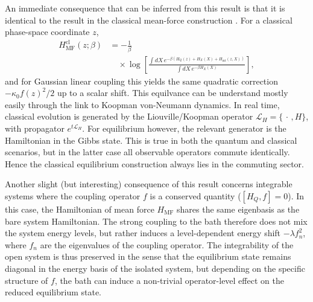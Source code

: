 An immediate consequence that can be inferred from this result is that it is identical to the result in the classical mean-force construction
\cite{campisiTalknerHanggi2009Solvable,talknerColloquiumStatisticalMechanics2020,cerisolaQuantumClassicalCorrespondence2024}.
For a classical phase-space coordinate $z$,
\begin{equation}
\begin{split}
    H_{\mathrm{MF}}^{\mathrm{cl}}(z;\beta)
    &=
    -\frac{1}{\beta} \\
    &\quad \times \log\!\left[
    \frac{\int dX\,e^{-\beta\left(H_Q(z)+H_X(X)+H_{\mathrm{int}}(z,X)\right)}}
    {\int dX\,e^{-\beta H_X(X)}}
    \right],
\end{split}
    \label{eq:hmf_classical_def_sec3}
\end{equation}
and for Gaussian linear coupling this yields the same quadratic correction $-\kappa_0 f(z)^2/2$ up to a scalar shift. This equilvance can be understand mostly easily through the link to Koopman von-Neumann dynamics. In real time, classical evolution is generated by the Liouville/Koopman operator $\mathcal L_H=\{\,\cdot\,,H\}$, with propagator $e^{t\mathcal L_H}$.
For equilibrium however, the relevant generator is the Hamiltonian in the Gibbs state. This is true in both the quantum and classical scenarios, but in the latter case all observable operators commute identically. Hence the classical equilibrium construction always lies in the commuting sector.

Another slight (but interesting) consequence of this result concerns integrable systems where the coupling operator $f$ is a conserved quantity ($[H_Q, f]=0$). In this case, the Hamiltonian of mean force $H_{\mathrm{MF}}$ shares the same eigenbasis as the bare system Hamiltonian. The strong coupling to the bath therefore does not mix the system energy levels, but rather induces a level-dependent energy shift $-\lambda f_n^2$, where $f_n$ are the eigenvalues of the coupling operator. The integrability of the open system is thus preserved in the sense that the equilibrium state remains diagonal in the energy basis of the isolated system, but depending on the specific structure of $f$, the bath can induce a non-trivial operator-level effect on the reduced equilibrium state. 

